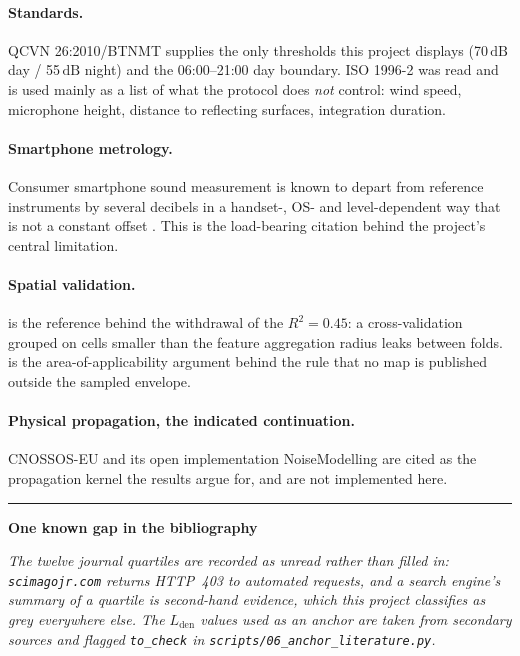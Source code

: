 \documentclass[11pt,a4paper]{article}
\newcommand{\dB}{\ensuremath{\,\mathrm{dB}}}
\newcommand{\pth}[1]{\texttt{\small #1}}
\newenvironment{caveat}[1]
 {\par\medskip\noindent\begin{minipage}{\linewidth}%
 \color{warnc}\rule{2pt}{\baselineskip}\hspace{.6em}\textbf{#1}\par\vspace{.2em}
 \hspace*{1.4em}\begin{minipage}{\dimexpr\linewidth-1.4em\relax}\small\itshape}
 {\end{minipage}\end{minipage}\par\medskip}
\begin{document}
\paragraph{Standards.}
QCVN 26:2010/BTNMT \citep{qcvn26} supplies the only thresholds this project
displays (70\dB{} day / 55\dB{} night) and the 06:00--21:00 day boundary. ISO
1996-2 \citep{iso1996part2} was read and is used mainly as a list of what the
protocol does \emph{not} control: wind speed, microphone height, distance to
reflecting surfaces, integration duration.

\paragraph{Smartphone metrology.}
Consumer smartphone sound measurement is known to depart from reference
instruments by several decibels in a handset-, OS- and level-dependent way that is
not a constant offset \citep{kardous2014smartphone, murphy2016smartphone}. This is
the load-bearing citation behind the project's central limitation.

\paragraph{Spatial validation.}
\citet{roberts2017crossvalidation} is the reference behind the withdrawal of the
$R^2=0.45$: a cross-validation grouped on cells smaller than the feature
aggregation radius leaks between folds. \citet{meyer2021aoa} is the
area-of-applicability argument behind the rule that no map is published outside
the sampled envelope.

\paragraph{Physical propagation, the indicated continuation.}
CNOSSOS-EU \citep{kephalopoulos2014cnossos} and its open implementation
NoiseModelling \citep{bocher2019noisemodelling} are cited as the propagation
kernel the results argue for, and are not implemented here.

\begin{caveat}{One known gap in the bibliography}
The twelve journal quartiles are recorded as unread rather than filled in:
\pth{scimagojr.com} returns HTTP~403 to automated requests, and a search
engine's summary of a quartile is second-hand evidence, which this project
classifies as grey everywhere else. The \citet{phan2010characteristics}
$L_\mathrm{den}$ values used as an anchor are taken from secondary sources and
flagged \pth{to\_check} in \pth{scripts/06\_anchor\_literature.py}.
\end{caveat}
\end{document}
